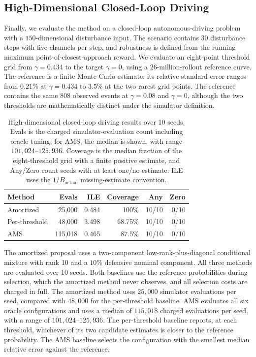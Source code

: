 \documentclass[twoside,11pt]{article}
\begin{document}
\subsection{High-Dimensional Closed-Loop Driving}
\label{sec:driving-results}

Finally, we evaluate the method on a closed-loop autonomous-driving problem with a $150$-dimensional disturbance input. The scenario contains 30 disturbance steps with five channels per step, and robustness is defined from the running maximum point-of-closest-approach reward. We evaluate an eight-point threshold grid from $\gamma=0.434$ to the target $\gamma=0$, using a $26$-million-rollout reference curve. The reference is a finite Monte Carlo estimate: its relative standard error ranges from $0.21\%$ at $\gamma=0.434$ to $3.5\%$ at the two rarest grid points. The reference contains the same $808$ observed events at $\gamma=0.08$ and $\gamma=0$, although the two thresholds are mathematically distinct under the simulator definition.

\begin{table}[ht!]
\centering
\caption{
    High-dimensional closed-loop driving results over 10 seeds. Evals is the charged simulator-evaluation count including oracle tuning; for AMS, the median is shown, with range \(101{,}024\)--\(125{,}936\). Coverage is the median fraction of the eight-threshold grid with a finite positive estimate, and Any/Zero count seeds with at least one/no estimate. ILE uses the \(1/B_{\mathrm{actual}}\) missing-estimate convention.
    }
\label{tab:driving-results}
\begin{tabular}{@{}lrrrrr@{}}
\toprule
Method & Evals & ILE & Coverage & Any & Zero \\
\midrule
Amortized     & 25,000  & 0.484 & 100\%   & 10/10 & 0/10 \\
Per-threshold & 48,000  & 3.498 & 68.75\% & 10/10 & 0/10 \\
AMS           & 115,018 & 0.465 & 87.5\%  & 10/10 & 0/10 \\
\bottomrule
\end{tabular}
\end{table}

The amortized proposal uses a two-component low-rank-plus-diagonal conditional mixture with rank 10 and a $10\%$ defensive nominal component. All three methods are evaluated over 10 seeds. Both baselines use the reference probabilities during selection, which the amortized method never observes, and all selection costs are charged in full. The amortized method uses \(25{,}000\) simulator evaluations per seed, compared with \(48{,}000\) for the per-threshold baseline. AMS evaluates all six oracle configurations and uses a median of \(115{,}018\) charged evaluations per seed, with a range of \(101{,}024\)--\(125{,}936\). The per-threshold baseline reports, at each threshold, whichever of its two candidate estimates is closer to the reference probability. The AMS baseline selects the configuration with the smallest median relative error against the reference.
\end{document}
